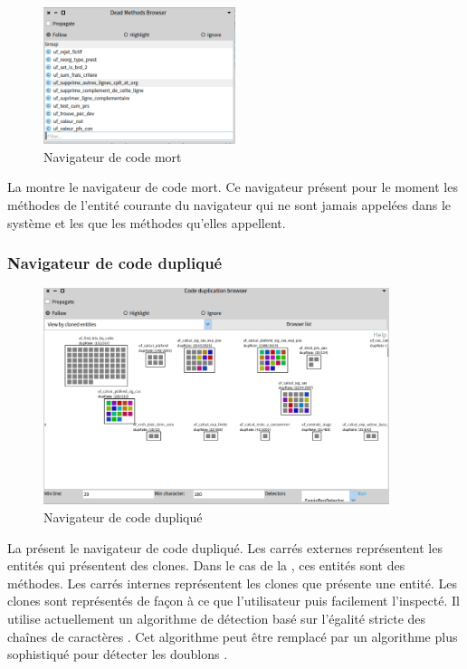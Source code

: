 \documentclass[a4paper]{article}
\begin{document}
\begin{figure}[htbp]
  \begin{center}
  \includegraphics[width=0.5\textwidth]{./figures/deadMethodBrowser.png}
  \caption{Navigateur de code mort}
  \label{fig:deadMethodBrowser}
\end{center}
\vspace{-0.3cm}
\end{figure}
La  montre le navigateur de code mort.
Ce navigateur présent pour le moment les méthodes de l'entité courante du navigateur qui ne sont jamais appelées dans le système et les que les méthodes qu'elles appellent.

\subsubsection{Navigateur de code dupliqué}
\begin{figure}[htbp]
  \begin{center}
  \includegraphics[width=0.9\textwidth]{./figures/duplicationBrowser.png}
  \caption{Navigateur de code dupliqué}
  \label{fig:duplicationBrowser}
\end{center}
\vspace{-0.3cm}
\end{figure}
La  présent le navigateur de code dupliqué. Les carrés externes représentent les entités qui présentent des clones.
Dans le cas de la , ces entités sont des  méthodes. 
Les carrés internes représentent les clones que présente une entité.
Les clones sont représentés de façon à ce que l'utilisateur puis facilement l'inspecté.
Il utilise actuellement un algorithme de détection basé sur l'égalité stricte des chaînes de caractères \citep{Duca99b}. 
Cet algorithme peut être remplacé par un algorithme plus sophistiqué pour détecter les doublons \citep{Roy07a}. 
\end{document}
